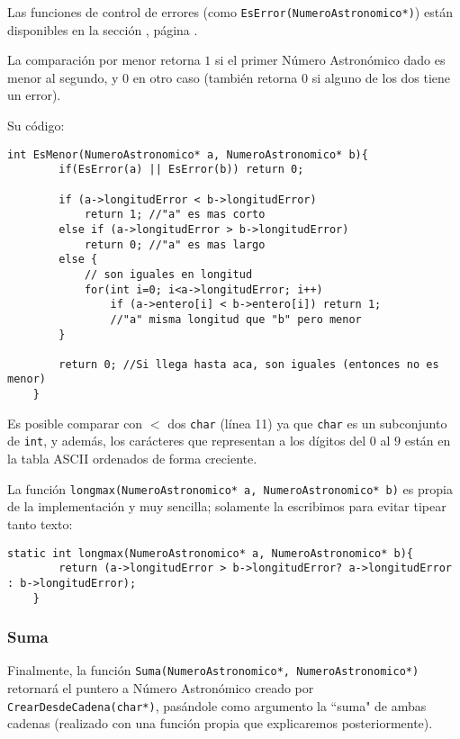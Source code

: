 \documentclass[a4paper, 12pt]{article}
\begin{document}
Las funciones de control de errores (como \verb|EsError(NumeroAstronomico*)|) están disponibles en la sección , página \pageref{errores}.

La comparación por menor retorna $1$ si el primer Número Astronómico dado es menor al segundo, y $0$ en otro caso (también retorna $0$ si alguno de los dos tiene un error).

Su código:

\begin{lstlisting}[style=C]
    int EsMenor(NumeroAstronomico* a, NumeroAstronomico* b){
        if(EsError(a) || EsError(b)) return 0;
        
        if (a->longitudError < b->longitudError)
            return 1; //"a" es mas corto
        else if (a->longitudError > b->longitudError)
            return 0; //"a" es mas largo
        else {
            // son iguales en longitud
            for(int i=0; i<a->longitudError; i++)
                if (a->entero[i] < b->entero[i]) return 1;
                //"a" misma longitud que "b" pero menor
        }
        
        return 0; //Si llega hasta aca, son iguales (entonces no es menor)
    }
\end{lstlisting}

Es posible comparar con $<$ dos \verb|char| (línea 11) ya que \verb|char| es un subconjunto de \verb|int|, y además, los carácteres que representan a los dígitos del $0$ al $9$ están en la tabla ASCII ordenados de forma creciente.

La función \verb|longmax(NumeroAstronomico* a, NumeroAstronomico* b)| es propia de la implementación y muy sencilla; solamente la escribimos para evitar tipear tanto texto:

\begin{lstlisting}[style=C]
    static int longmax(NumeroAstronomico* a, NumeroAstronomico* b){
        return (a->longitudError > b->longitudError? a->longitudError : b->longitudError);
    }
\end{lstlisting}

\subsubsection{Suma}\label{aritmetica-suma}

Finalmente, la función \verb|Suma(NumeroAstronomico*, NumeroAstronomico*)| retornará el puntero a Número Astronómico creado por \verb|CrearDesdeCadena(char*)|, pasándole como argumento la ``suma" de ambas cadenas (realizado con una función propia que explicaremos posteriormente).
\end{document}
